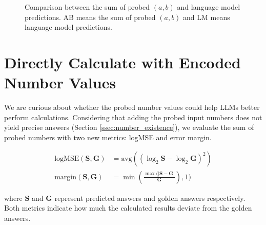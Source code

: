 \documentclass[11pt]{article}
\begin{document}
\begin{figure}
    \centering
    \caption{Comparison between the sum of probed $(a, b)$ and language model predictions. AB means the sum of probed $(a, b)$ and LM means language model predictions.}
    \label{fig:addition_comparision}
\end{figure}

\section{Directly Calculate with Encoded Number Values}
\label{sec:appendix_direct}
We are curious about whether the probed number values could help LLMs better perform calculations.
Considering that adding the probed input numbers does not yield precise answers (Section \ref{ssec:number_existence}), we evaluate the sum of probed numbers with two new metrics: logMSE and error margin.

\begin{align}
    \text{logMSE}(\mathbf{S}, \mathbf{G}) &= \text{avg}((\log_{2}\mathbf{S} - \log_{2}\mathbf{G})^2) \\
    \text{margin}(\mathbf{S}, \mathbf{G}) &= \min(\frac{\max(|\mathbf{S}-\mathbf{G}|}{\mathbf{G}}), 1)
\end{align}

where $\mathbf{S}$ and $\mathbf{G}$ represent predicted answers and golden answers respectively.
Both metrics indicate how much the calculated results deviate from the golden answers.
\end{document}

